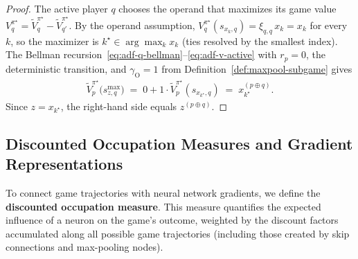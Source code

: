 \documentclass[twoside]{article}
\newcommand{\1}{\mathbf{1}}
\begin{document}
\begin{proof}
The active player $q$ chooses the operand that maximizes its game value $V_q^{\pi^\star} = \tilde
    V_q^{\pi^\star} - \tilde V_{q'}^{\pi^\star}$. By the operand assumption,
$V_q^{\pi^\star}(s_{x_k,q}) = \xi_{q,q}\, x_k = x_k$ for every $k$, so the maximizer is $k^\star
    \in \arg\max_k x_k$ (ties resolved by the smallest index). The Bellman
recursion~\eqref{eq:adf-q-bellman}--\eqref{eq:adf-v-active} with $r_p = 0$, the deterministic
transition, and $\gamma_{\mathrm{O}} = 1$ from Definition~\ref{def:maxpool-subgame} gives
\begin{align}
    \tilde V_p^{\pi^\star}\bigl(s_{z,q}^{\max}\bigr) \;=\; 0 + 1 \cdot \tilde
    V_p^{\pi^\star}(s_{x_{k^\star},q}) \;=\; x_{k^\star}^{(p\oplus q)}.
\end{align}
Since $z = x_{k^\star}$, the right-hand side equals $z^{(p\oplus q)}$.
\end{proof}

\subsection{Discounted Occupation Measures and Gradient Representations}\label{app:occ-deriv}

To connect game trajectories with neural network gradients, we define the \textbf{discounted
occupation measure}. This measure quantifies the expected influence of a neuron on the game's
outcome, weighted by the discount factors accumulated along all possible game trajectories
(including those created by skip connections and max-pooling nodes).
\end{document}
